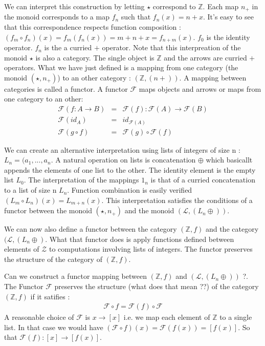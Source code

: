 \documentclass[12pt,fleqn]{article}
\begin{document}
We can interpret this construction by letting $\star$ correspond to $\mathbb{Z}$.
Each map $n_+$ in the monoid corresponds to a map $f_n$ such that $f_n(x) = n + x$.
It's easy to see that this correspondence respects function composition : $(f_m \circ f_n) (x) = f_m(f_n(x)) = m + n + x = f_{n+m}(x)$.
$f_0$ is the identity operator.
$f_n$ is the a curried $+$ operator. 
Note that this interpreation of the monoid $\star$ is also a category. The single object is $\mathbb{Z}$ and the arrows are curried $+$ operators.
What we have just defined is a mapping from one category (the monoid $(\star, n_+)$) to an other category : $(\mathbb{Z}, (n +))$.
A mapping between categories is called a functor. 
A functor $\mathcal{F}$ maps objects and arrows or maps from one category to an other:
\begin{eqnarray*}
\mathcal{F} (f : A \rightarrow B) &=& \mathcal{F}(f) : \mathcal{F}(A) \rightarrow \mathcal{F}(B) \\
\mathcal{F}(id_A) &=& id_{\mathcal{F}(A)} \\
\mathcal{F}(g \circ f) &=& \mathcal{F}(g) \circ \mathcal{F}(f)
\end{eqnarray*}

We can create an alternative interpretation using lists of integers of size n : $L_{n} = (a_1,...,a_{n}$. 
A natural operation on lists is concatenation $\oplus$ which basicallt appends the elements of one list to the other.
The identity element is the empty list $L_0$.
The interpretation of the mappings $1_n$ is that of a curried concatenation to a list of size n $L_{n}$.
Function combination is easily verified $(L_m \circ L_n)(x) = L_{m+n} (x)$.
This interpretation satisfies the conditions of a functor between the monoid $(\star, n_+)$ and the monoid $(\mathcal{L},(L_n \oplus ))$.

We can now also define a functor between the category $(\mathbb{Z}, f)$ and the category $(\mathcal{L}, (L_n \oplus)$.
What that functor does is apply functions defined between elements of $\mathcal{Z}$ to computations involving lists of integers.
The functor preserves the structure of the category of $(\mathbb{Z}, f)$.

Can we construct a functor mapping between $(\mathbb{Z}, f)$ and $(\mathcal{L}, (L_n \oplus ))$ ?.
The Functor $\mathcal{F}$ preserves the structure (what does that mean ??) of the category $(\mathbb{Z}, f)$ if it satifies :
\begin{eqnarray*}
\mathcal{F} \circ f = \mathcal{F}(f) \circ \mathcal{F} 
\end{eqnarray*}
A reasonable choice of $\mathcal{F}$ is $x \rightarrow [x]$ i.e. we map each element of $\mathbb{Z}$ to a single list.
In that case we would have $(\mathcal{F} \circ f)(x) = \mathcal{F}(f(x)) = [f(x)]$.
So that $\mathcal{F}(f) : [x] \rightarrow [f(x)]$.
\end{document}
